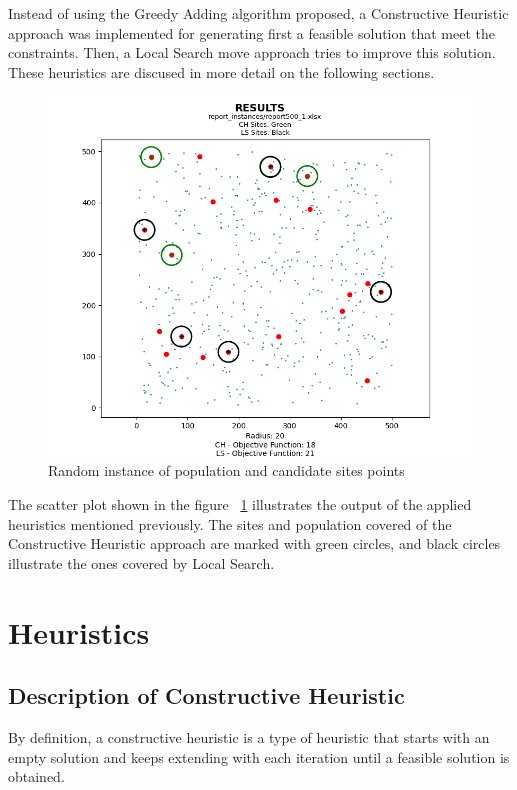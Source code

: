 \documentclass[11pt, a4paper]{article}
\begin{document}
Instead of using the Greedy Adding algorithm proposed, a Constructive Heuristic approach was implemented for generating first a feasible solution that meet the constraints. Then, a Local Search move approach tries to improve this solution. These heuristics are discused in more detail on the following sections.

\begin{figure}[h]
	\centering
	\includegraphics[scale=0.6]{example_instance_output.png}
	\caption{Random instance of population and candidate sites points}
	\label{fig:example_instance_output}
\end{figure}

The scatter plot shown in the figure ~\ref{fig:example_instance_output} illustrates the output of the applied heuristics mentioned previously. The sites and population covered of the Constructive Heuristic approach are marked with green circles, and black circles illustrate the ones covered by Local Search. 


\section{Heuristics}\label{sec:exp}

\subsection{Description of Constructive Heuristic}
By definition, a constructive heuristic is a type of heuristic that starts with an empty solution and keeps extending with each iteration until a feasible solution is obtained.
\end{document}
